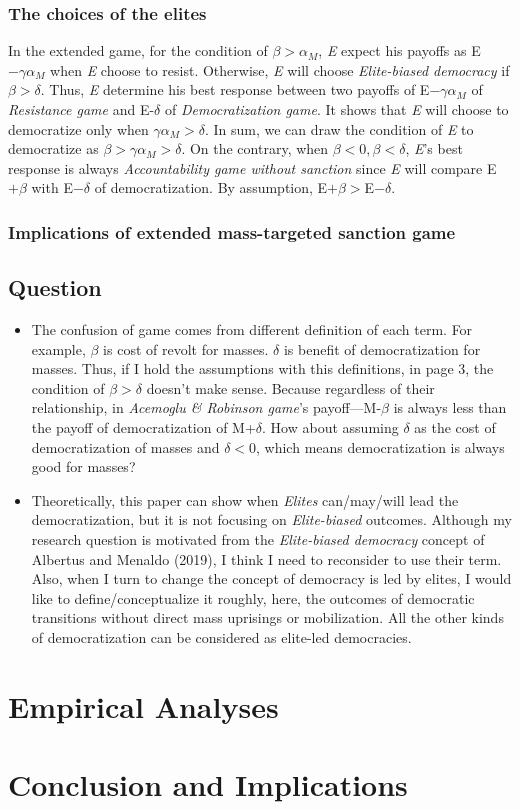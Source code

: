 \documentclass[11pt]{article}
\begin{document}
\subsubsection*{The choices of the elites}

In the extended game, for the condition of $\beta > \alpha_{M}$, \textit{E} expect his payoffs as E$-\gamma\alpha_{M}$ when \textit{E} choose to resist. Otherwise, \textit{E} will choose \textit{Elite-biased democracy} if $\beta > \delta$. Thus, \textit{E} determine his best response between two payoffs of E$-\gamma\alpha_{M}$ of \textit{Resistance game} and E-$\delta$ of \textit{Democratization game}. It shows that \textit{E} will choose to democratize only when $\gamma\alpha_{M} > \delta$. In sum, we can draw the condition of \textit{E} to democratize as $\beta > \gamma\alpha_{M} > \delta$.  On the contrary, when $\beta < 0, \beta < \delta$, \textit{E}'s best response is always \textit{Accountability game without sanction} since \textit{E} will compare E$+\beta$ with E$-\delta$ of democratization. By assumption, E$+\beta >$E$-\delta$.

\subsubsection*{Implications of extended mass-targeted sanction game}

\subsection*{Question}
\begin{itemize}
	\item The confusion of game comes from different definition of each term. For example, $\beta$ is cost of revolt for masses. $\delta$ is benefit of democratization for masses. Thus, if I hold the assumptions with this definitions, in page 3, the condition of $\beta > \delta$ doesn't make sense. Because regardless of their relationship, in \textit{Acemoglu \& Robinson game}'s payoff---M-$\beta$ is always less than the payoff of democratization of M+$\delta$. How about assuming $\delta$ as the cost of democratization of masses and $\delta <0$, which means democratization is always good for masses?
	\item Theoretically, this paper can show when \textit{Elites} can/may/will lead the democratization, but it is not focusing on \textit{Elite-biased} outcomes. Although my research question is motivated from the \textit{Elite-biased democracy} concept of Albertus and Menaldo (2019), I think I need to reconsider to use their term. Also, when I turn to change the concept of democracy is led by elites, I would like to define/conceptualize it roughly, here, the outcomes of democratic transitions without direct mass uprisings or mobilization. All the other kinds of democratization can be considered as elite-led democracies.
\end{itemize}

\section*{Empirical Analyses}

\section*{Conclusion and Implications}



	
\end{document}
